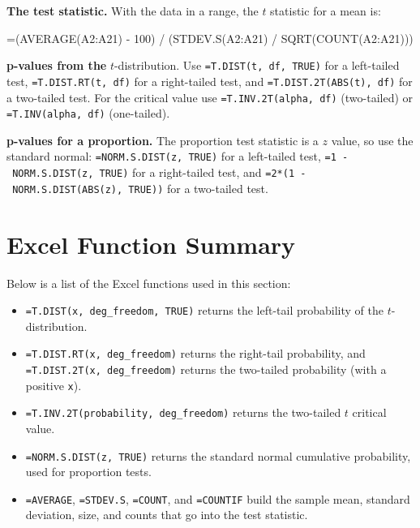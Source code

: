 \documentclass[
  11pt,
  letterpaper,
  DIV=11,
  numbers=noendperiod,
  oneside,
  open=any]{scrreprt}
\newenvironment{Shaded}{\begin{snugshade}}{\end{snugshade}}
\newcommand{\NormalTok}[1]{\textcolor[rgb]{0.00,0.23,0.31}{#1}}
\begin{document}
\textbf{The test statistic.} With the data in a range, the \(t\)
statistic for a mean is:

\begin{Shaded}
\begin{Highlighting}[]
\NormalTok{=(AVERAGE(A2:A21) {-} 100) / (STDEV.S(A2:A21) / SQRT(COUNT(A2:A21)))}
\end{Highlighting}
\end{Shaded}

\textbf{p-values from the} \(t\)-distribution. Use
\texttt{=T.DIST(t,\ df,\ TRUE)} for a left-tailed test,
\texttt{=T.DIST.RT(t,\ df)} for a right-tailed test, and
\texttt{=T.DIST.2T(ABS(t),\ df)} for a two-tailed test. For the critical
value use \texttt{=T.INV.2T(alpha,\ df)} (two-tailed) or
\texttt{=T.INV(alpha,\ df)} (one-tailed).

\textbf{p-values for a proportion.} The proportion test statistic is a
\(z\) value, so use the standard normal: \texttt{=NORM.S.DIST(z,\ TRUE)}
for a left-tailed test, \texttt{=1\ -\ NORM.S.DIST(z,\ TRUE)} for a
right-tailed test, and \texttt{=2*(1\ -\ NORM.S.DIST(ABS(z),\ TRUE))}
for a two-tailed test.

\section{Excel Function Summary}\label{excel-function-summary-10}

Below is a list of the Excel functions used in this section:

\begin{itemize}
\item
  \texttt{=T.DIST(x,\ deg\_freedom,\ TRUE)} returns the left-tail
  probability of the \(t\)-distribution.
\item
  \texttt{=T.DIST.RT(x,\ deg\_freedom)} returns the right-tail
  probability, and \texttt{=T.DIST.2T(x,\ deg\_freedom)} returns the
  two-tailed probability (with a positive \texttt{x}).
\item
  \texttt{=T.INV.2T(probability,\ deg\_freedom)} returns the two-tailed
  \(t\) critical value.
\item
  \texttt{=NORM.S.DIST(z,\ TRUE)} returns the standard normal cumulative
  probability, used for proportion tests.
\item
  \texttt{=AVERAGE}, \texttt{=STDEV.S}, \texttt{=COUNT}, and
  \texttt{=COUNTIF} build the sample mean, standard deviation, size, and
  counts that go into the test statistic.
\end{itemize}
\end{document}
